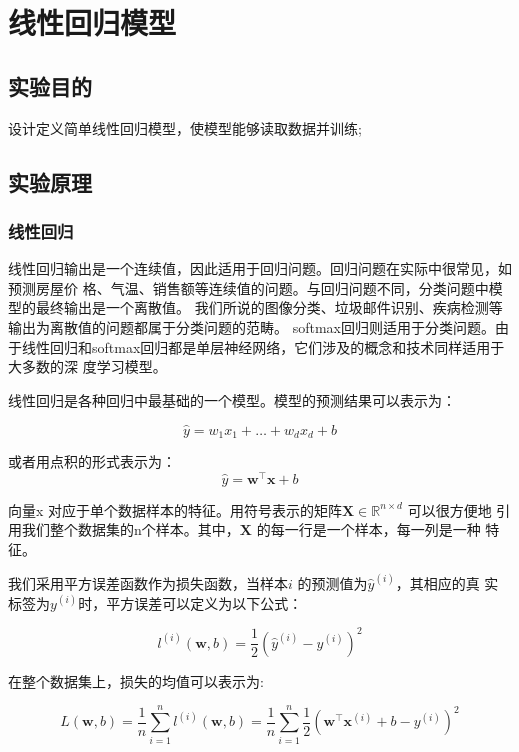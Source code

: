 \documentclass[a4paper,12pt]{article}
\begin{document}
\section{线性回归模型}
\subsection{实验目的}
设计定义简单线性回归模型，使模型能够读取数据并训练;

\subsection{实验原理}
\subsubsection{线性回归}
线性回归输出是⼀个连续值，因此适⽤于回归问题。回归问题在实际中很常见，如预测房屋价
格、⽓温、销售额等连续值的问题。与回归问题不同，分类问题中模型的最终输出是⼀个离散值。
我们所说的图像分类、垃圾邮件识别、疾病检测等输出为离散值的问题都属于分类问题的范畴。
softmax回归则适⽤于分类问题。由于线性回归和softmax回归都是单层神经⽹络，它们涉及的概念和技术同样适⽤于⼤多数的深
度学习模型。

线性回归是各种回归中最基础的一个模型。模型的预测结果可以表示为：

\begin{equation}
\hat{y} = w_1x_1 + \dots + w_dx_d + b
\end{equation}

或者用点积的形式表示为：
\begin{equation}
\hat{y} = \mathbf{w}^\top \mathbf{x} + b
\end{equation}

向量x 对应于单个数据样本的特征。用符号表示的矩阵\( \mathbf{X} \in \mathbb{R}^{n \times d}
\) 可以很方便地
引用我们整个数据集的n个样本。其中，\(\mathbf{X}\) 的每一行是一个样本，每一列是一种
特征。

我们采用平方误差函数作为损失函数，当样本$\mathit{i}$ 的预测值为$\hat{y}^{(i)}$，其相应的真
实标签为$y^{(i)}$时，平方误差可以定义为以下公式：

\begin{equation}
l^{(i)}(\mathbf{w}, b) = \frac{1}{2} \left( \hat{y}^{(i)} - y^{(i)} \right)^2
\end{equation}

在整个数据集上，损失的均值可以表示为:

\begin{equation}
L(\mathbf{w}, b) = \frac{1}{n} \sum_{i=1}^{n} l^{(i)}(\mathbf{w}, b) = \frac{1}{n} \sum_{i=1}^{n} \frac{1}{2} \left( \mathbf{w}^\top \mathbf{x}^{(i)} + b - y^{(i)} \right)^2
\end{equation}
\end{document}
